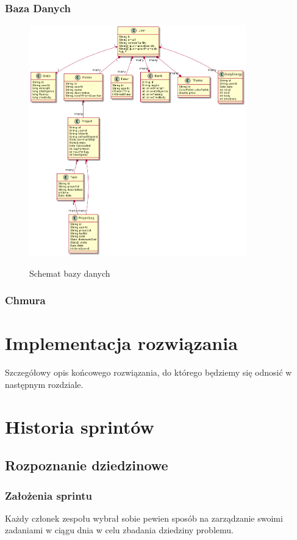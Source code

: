 \documentclass[a4paper,11pt]{report}
\begin{document}
\subsection{Baza Danych}
\begin{figure}[h]
	\centering
	\includegraphics[width=\textwidth, height=10cm]{gamitude database model.png}\\
	\caption{Schemat bazy danych}
	\label{fig:db}
\end{figure}
\subsection{Chmura}

\chapter {Implementacja rozwiązania}
Szczegółowy opis końcowego rozwiązania, do którego będziemy się odnosić w następnym rozdziale.

\chapter {Historia sprintów}
\section {Rozpoznanie dziedzinowe}
\subsection {Założenia sprintu}
Każdy członek zespołu wybrał sobie pewien sposób na zarządzanie swoimi zadaniami w ciągu dnia w celu zbadania dziedziny problemu.
\end{document}
